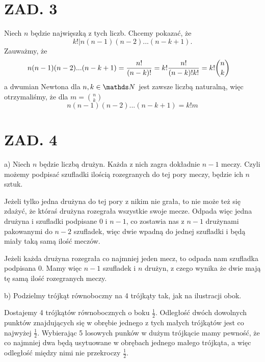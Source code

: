 \documentclass{article}[13pt]
\begin{document}
\section*{ZAD. 3}

Niech $n$ będzie najwięszką z tych liczb. Chcemy pokazać, że
$$k!|n(n-1)(n-2)...(n-k+1).$$
Zauważmy, że
\begin{align*}
    n(n-1)(n-2)...(n-k+1)&={n!\over(n-k)!}=k!{n!\over(n-k)!k!}=k!{n\choose k}
\end{align*}
a dwumian Newtona dla $n,k\in\N$ jest zawsze liczbą naturalną, więc otrzymaliśmy, że dla $m={n\choose k}$
$$n(n-1)(n-2)...(n-k+1)=k!m$$

\section*{ZAD. 4}

{\color{acc}a)} Niech $n$ będzie liczbą drużyn. Każda z nich zagra dokładnie $n-1$ meczy. Czyli możemy podpisać szufladki ilością rozegranych do tej pory meczy, będzie ich $n$ sztuk. 
\smallskip

Jeżeli tylko jedna drużyna do tej pory z nikim nie grała, to nie może też się zdażyć, że któraś drużyna rozegrała wszystkie swoje mecze. Odpada więc jedna drużyna i szufladki podpisane 0 i $n-1$, co zostawia nas z $n-1$ drużynami pakowanymi do $n-2$ szufladek, więc dwie wpadną do jednej szufladki i będą miały taką samą ilość meczów.
\smallskip

Jeżeli każda drużyna rozegrała co najmniej jeden mecz, to odpada nam szufladka podpisana 0. Mamy więc $n-1$ szufladek i $n$ drużyn, z czego wynika że dwie mają tę samą ilość rozegranych meczy.
\medskip

{\color{acc}b)} Podzielmy trójkąt równoboczny na 4 trójkąty tak, jak na ilustracji obok.
\begin{wrapfigure}{r}{0.25\textwidth}
\end{wrapfigure}
Dostajemy 4 trójkątów równobocznych o boku $\frac12$. Odległość dwóch dowolnych punktów znajdujących się w obrębie jednego z tych małych trójkątów jest co najwyżej $\frac12$. Wybierając 5 losowych punków w dużym trójkącie mamy pewność, że co najmniej dwa będą usytuowane w obrębach jednego małego trójkąta, a więc odległość między nimi nie przekroczy $\frac12$.
\medskip
\end{document}
